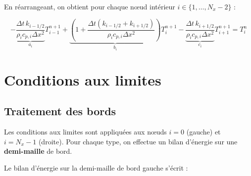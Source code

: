 \documentclass[11pt,a4paper]{article}
\begin{document}
En réarrangeant, on obtient pour chaque nœud intérieur $i \in \{1, \ldots, N_x-2\}$ :

\begin{equation}
-\underbrace{\frac{\Delta t \, k_{i-1/2}}{\rho_i c_{p,i} \Delta x^2}}_{a_i} T_{i-1}^{n+1} 
+ \underbrace{\left(1 + \frac{\Delta t (k_{i-1/2} + k_{i+1/2})}{\rho_i c_{p,i} \Delta x^2}\right)}_{b_i} T_i^{n+1}
- \underbrace{\frac{\Delta t \, k_{i+1/2}}{\rho_i c_{p,i} \Delta x^2}}_{c_i} T_{i+1}^{n+1}
= T_i^n
\end{equation}

\section{Conditions aux limites}

\subsection{Traitement des bords}

Les conditions aux limites sont appliquées aux nœuds $i=0$ (gauche) et $i=N_x-1$ (droite). Pour chaque type, on effectue un bilan d'énergie sur une \textbf{demi-maille} de bord.

\begin{center}
\end{center}

Le bilan d'énergie sur la demi-maille de bord gauche s'écrit :
\end{document}
